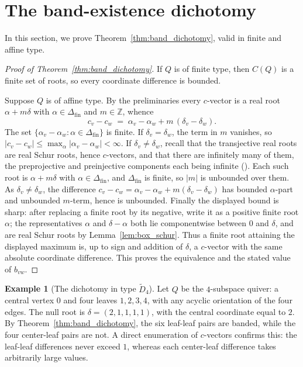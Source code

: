 \documentclass[11pt, a4paper]{amsart}
\theoremstyle{definition}
\newtheorem{example}[theorem]{Example}
\newcommand{\ZZ}{\mathbb{Z}}
\begin{document}
\section{The band-existence dichotomy}
\label{sec:band}

In this section, we prove Theorem~\ref{thm:band_dichotomy}, valid in
finite and affine type.

\begin{proof}[Proof of Theorem~\ref{thm:band_dichotomy}]
If $Q$ is of finite type, then $C(Q)$ is a finite set of roots, so every
coordinate difference is bounded.

Suppose $Q$ is of affine type. By the preliminaries every $c$-vector is a
real root $\alpha + m\delta$ with $\alpha \in \Delta_{\mathrm{fin}}$ and
$m \in \ZZ$, whence
\[
  c_v - c_w \;=\; \alpha_v - \alpha_w + m\,(\delta_v - \delta_w).
\]
The set $\{\alpha_v - \alpha_w : \alpha \in \Delta_{\mathrm{fin}}\}$ is
finite. If $\delta_v = \delta_w$, the term in $m$ vanishes, so
$|c_v - c_w| \leq \max_\alpha |\alpha_v - \alpha_w| < \infty$. If
$\delta_v \neq \delta_w$, recall that the transjective real roots are
real Schur roots, hence $c$-vectors, and that there are infinitely many of
them, the preprojective and preinjective components each being infinite
\textup{(}\cite[\S3]{Ringel1984}\textup{)}. Each such root is
$\alpha + m\delta$ with $\alpha \in \Delta_{\mathrm{fin}}$, and
$\Delta_{\mathrm{fin}}$ is finite, so $|m|$ is unbounded over them. As
$\delta_v \neq \delta_w$, the difference $c_v - c_w = \alpha_v -
\alpha_w + m(\delta_v - \delta_w)$ has bounded $\alpha$-part and unbounded
$m$-term, hence is unbounded. Finally the displayed bound is sharp: after
replacing a finite root by its negative, write it as a positive finite root
$\alpha$; the representatives $\alpha$ and $\delta-\alpha$ both lie
componentwise between $0$ and $\delta$, and are real Schur roots by
Lemma~\ref{lem:box_schur}. Thus a finite root attaining the displayed
maximum is, up to sign and addition of $\delta$, a $c$-vector with the same
absolute coordinate difference. This proves the equivalence and the stated
value of $b_{vw}$.
\end{proof}

\begin{example}[The dichotomy in type $\widetilde{D}_4$]
\label{ex:D4}
Let $Q$ be the $4$-subspace quiver: a central vertex $0$ and four leaves
$1, 2, 3, 4$, with any acyclic orientation of the four edges. The null
root is $\delta = (2, 1, 1, 1, 1)$, with the central coordinate equal to
$2$. By Theorem~\ref{thm:band_dichotomy}, the six leaf-leaf pairs are
banded, while the four center-leaf pairs are not. A direct enumeration of
$c$-vectors confirms this: the leaf-leaf differences never exceed $1$,
whereas each center-leaf difference takes arbitrarily large values.
\end{example}
\end{document}
